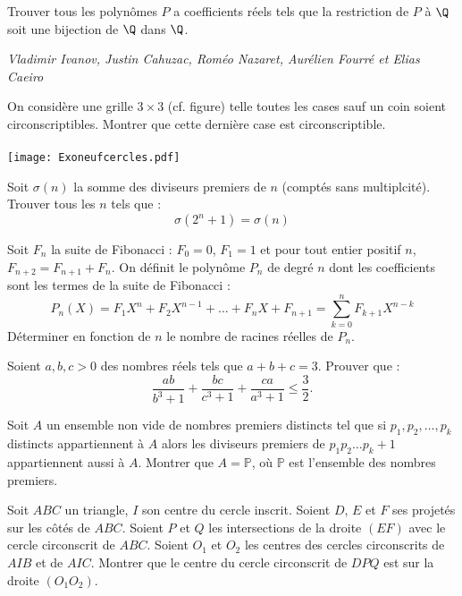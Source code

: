 \begin{exo}{}
Trouver tous les polynômes $P$ a coefficients réels tels que la restriction de $P$ à $\Q$ soit une bijection de $\Q$ dans $\Q$.

\medskip
\textit{Vladimir Ivanov, Justin Cahuzac, Roméo Nazaret, Aurélien Fourré et Elias Caeiro}

\end{exo}

\begin{exo}{}
On considère une grille $3\times 3$ (cf. figure) telle toutes les cases sauf un coin soient circonscriptibles. Montrer que cette dernière case est circonscriptible. \\~~\\
\texttt{[image: Exoneufcercles.pdf]}
\end{exo}


\begin{exo}{}
Soit $\sigma(n)$ la somme des diviseurs premiers de $n$ (comptés sans multiplcité). Trouver tous les $n$ tels que :
$$\sigma(2^n+1)=\sigma(n)$$
\end{exo}

\begin{exo}{}
Soit $F_n$ la suite de Fibonacci : $F_0=0$, $F_1=1$ et pour tout entier positif $n$, $F_{n+2}=F_{n+1}+F_n$.
On définit le polynôme $P_n$ de degré $n$ dont les coefficients sont les termes de la suite de Fibonacci :
$$P_n(X)= F_1X^n+F_2X^{n-1}+\ldots +F_nX+F_{n+1}=\sum_{k=0}^{n} F_{k+1}X^{n-k}$$
Déterminer en fonction de $n$ le nombre de racines réelles de $P_n$.
\end{exo}



\begin{exo}{}
Soient $a,b,c>0$ des nombres réels tels que $a+b+c=3$. Prouver que :
$$ \frac{ab}{b^{3}+1}+\frac{bc}{c^{3}+1}+\frac{ca}{a^{3}+1}\le\frac{3}{2}.$$
\end{exo}


\begin{exo}{}
Soit $A$ un ensemble non vide de nombres premiers distincts tel que si $p_1,p_2,\dots,p_k$ distincts appartiennent à $A$ alors les diviseurs premiers de $p_1p_2\dots p_k+1$ appartiennent aussi à $A$. Montrer que $A=\mathbb{P}$, où $\mathbb{P}$ est l'ensemble des nombres premiers.
\end{exo}

\begin{exo}{}
Soit $ABC$ un triangle, $I$ son centre du cercle inscrit. Soient $D$, $E$ et $F$ ses projetés sur les côtés de $ABC$. Soient $P$ et $Q$ les intersections de la droite $(EF)$ avec le cercle circonscrit de $ABC$. Soient $O_1$ et $O_2$ les centres des cercles circonscrits de $AIB$ et de $AIC$. Montrer que le centre du cercle circonscrit de $DPQ$ est sur la droite $(O_1O_2)$.
\end{exo}

